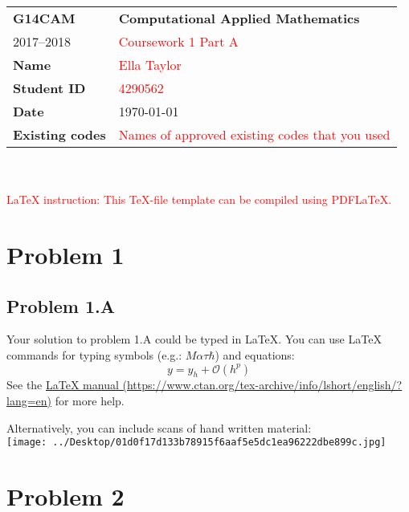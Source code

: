\documentclass[a4paper,12pt,onecolumn,final]{article}
\begin{document}


\noindent
\begin{tabular}{|p{}|p{}|}
\hline
\textbf{G14CAM} & \textbf{Computational Applied Mathematics}
\\
2017--2018 & \textcolor{red}{Coursework 1 Part A}
\\
\hline
\textbf{Name} & \textcolor{red}{Ella Taylor}
\\ 
\textbf{Student ID} & \textcolor{red}{4290562}
\\ 
\textbf{Date} & \today
\\
\hline
\textbf{Existing codes} & \textcolor{red}{Names of approved existing codes that you used}
\\
\hline
\end{tabular}
~\\
~\\
\textcolor{red}{LaTeX instruction: This TeX-file template can be compiled using PDFLaTeX.}
\\
\section*{Problem 1}
\subsection*{Problem 1.A}
Your solution to problem 1.A could be typed in LaTeX. You can use LaTeX commands for typing symbols (e.g.: $M \alpha \tau \hbar$) and equations:
%
\begin{equation}
    y = y_h + \mathcal{O}(h^p) 
\end{equation}
%
See the \href{https://www.ctan.org/tex-archive/info/lshort/english/?lang=en}{\underline{LaTeX manual (https://www.ctan.org/tex-archive/info/lshort/english/?lang=en)}} for more help.
\par
Alternatively, you can include scans of hand written material:
\\
\texttt{[image: ../Desktop/01d0f17d133b78915f6aaf5e5dc1ea96222dbe899c.jpg]}
\section*{Problem 2}
\end{document}
